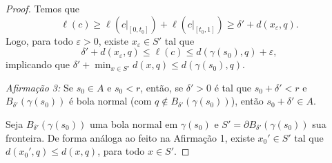\begin{lemma}
\begin{proof}
        Temos que
        \begin{equation*}
            \ell(c) \geq \ell(c|_{[0,t_0]}) + \ell(c|_{[t_0,1]}) \geq \delta' + d(x_\varepsilon, q).
        \end{equation*}
        Logo, para todo $\varepsilon > 0$, existe $x_\varepsilon \in S'$ tal que
        \begin{equation*}
            \delta' + d(x_\varepsilon, q) \leq \ell(c) \leq d(\gamma(s_0), q) + \varepsilon,
        \end{equation*}
        implicando que $\delta' + \min_{x \in S'} d(x,q) \leq d(\gamma(s_0), q)$.

        \emph{Afirmação 3:} Se $s_0 \in A$ e $s_0 < r$, então, se $\delta' > 0$ é tal que $s_0 + \delta' < r$ e $B_{\delta'}(\gamma(s_0))$ é bola normal (com $q \notin B_{\delta'}(\gamma(s_0))$), então $s_0 + \delta' \in A$.

        Seja $B_{\delta'}(\gamma(s_0))$ uma bola normal em $\gamma(s_0)$ e $S' = \partial B_{\delta'}(\gamma(s_0))$ sua fronteira.
        De forma análoga ao feito na Afirmação 1, existe $x_0' \in S'$ tal que $d(x_0', q) \leq d(x, q)$, para todo $x \in S'$.


\end{proof}
\end{lemma}
